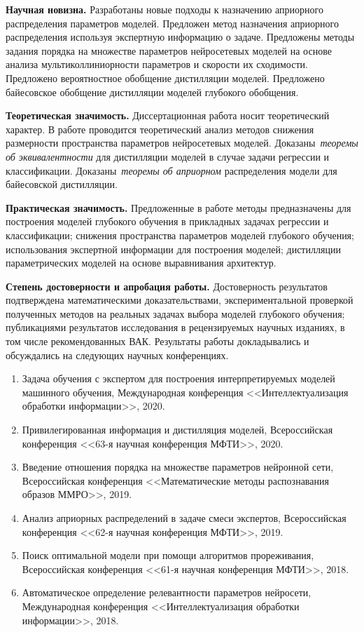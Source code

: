 \vspace{0.5cm}
\textbf{Научная новизна.} Разработаны новые подходы к назначению априорного распределения параметров моделей. Предложен метод назначения априорного распределения используя экспертную информацию о задаче. Предложены методы задания порядка на множестве параметров нейросетевых моделей на основе анализа мультиколлиниорности параметров и скорости их сходимости. Предложено вероятностное обобщение дистилляции моделей. Предложено байесовское обобщение дистилляции моделей глубокого обобщения.

\vspace{0.5cm}
\textbf{Теоретическая значимость.} Диссертационная работа носит теоретический характер. В работе проводится теоретический анализ методов снижения размерности пространства параметров нейросетевых моделей. Доказаны~\emph{теоремы об эквивалентности} для дистилляции моделей в случае задачи регрессии и классификации. Доказаны~\emph{теоремы об априорном} распределения модели для байесовской дистилляции.

\vspace{0.5cm}
\textbf{Практическая значимость.} Предложенные в работе методы предназначены для построения моделей глубокого обучения в прикладных задачах регрессии и классификации; снижения пространства параметров моделей глубокого обучения; использования экспертной информации для построения моделей; дистилляции параметрических моделей на основе выравнивания архитектур.

\vspace{0.5cm}
\textbf{Степень достоверности и апробация работы.} Достоверность результатов подтверждена математическими доказательствами, экспериментальной проверкой полученных методов на реальных задачах выбора моделей глубокого обучения; публикациями результатов исследования в рецензируемых научных изданиях, в том числе рекомендованных ВАК. Результаты работы докладывались и обсуждались на следующих научных конференциях.
\begin{enumerate}
    \item Задача обучения с экспертом для построения интерпретируемых моделей машинного обучения, Международная конференция <<Интеллектуализация обработки информации>>, 2020.
    \item Привилегированная информация и дистилляция моделей, Всероссийская конференция <<63-я научная конференция МФТИ>>, 2020.
    \item Введение отношения порядка на множестве параметров нейронной сети, Всероссийская конференция <<Математические методы распознавания образов ММРО>>, 2019.
    \item Анализ априорных распределений в задаче смеси экспертов, Всероссийская конференция <<62-я научная конференция МФТИ>>, 2019.
    \item Поиск оптимальной модели при помощи алгоритмов прореживания, Всероссийская конференция <<61-я научная конференция МФТИ>>, 2018.
    \item Автоматическое определение релевантности параметров нейросети, Международная конференция <<Интеллектуализация обработки информации>>, 2018.
\end{enumerate}

